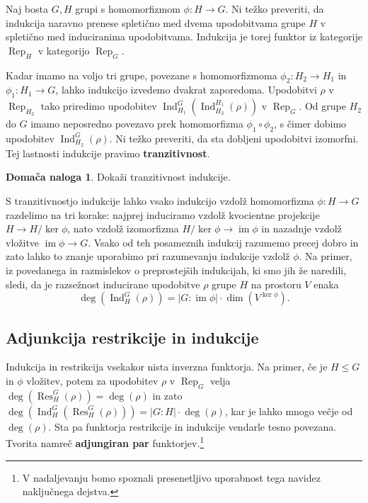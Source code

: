 \documentclass[11pt]{book}
\DeclareMathOperator\image{im}
\DeclareMathOperator\Res{Res}
\DeclareMathOperator\Ind{Ind}
\DeclareMathOperator\Rep{Rep}
\def\definicija{\color{rdeca}\bf}
\theoremstyle{definition}
\theoremstyle{zgled}
\theoremstyle{zgledbrezstevilke}
\theoremstyle{odprtproblem}
\theoremstyle{domacanaloga}
\newtheorem{domacanaloga}[theorem]{Domača naloga}
\theoremstyle{izrek}
\begin{document}
Naj bosta $G,H$ grupi s homomorfizmom $\phi \colon H \to G$. Ni težko preveriti, da indukcija naravno prenese spletično med dvema upodobitvama grupe $H$ v spletično med induciranima upodobitvama. Indukcija je torej funktor iz kategorije $\Rep_H$ v kategorijo $\Rep_G$.

Kadar imamo na voljo tri grupe, povezane s homomorfizmoma $\phi_2 \colon H_2 \to H_1$ in $\phi_1 \colon H_1 \to G$, lahko indukcijo izvedemo dvakrat zaporedoma. Upodobitvi $\rho$ v $\Rep_{H_2}$ tako priredimo upodobitev $\Ind^{G}_{H_1}(\Ind^{H_1}_{H_2}(\rho))$ v $\Rep_{G}$. Od grupe $H_2$ do $G$ imamo neposredno povezavo prek homomorfizma $\phi_1 \circ \phi_2$, s čimer dobimo upodobitev $\Ind^G_{H_2}(\rho)$. Ni težko preveriti, da sta dobljeni upodobitvi izomorfni. Tej lastnosti indukcije pravimo {\definicija tranzitivnost}.

\begin{domacanaloga}
    Dokaži tranzitivnost indukcije.
\end{domacanaloga}

S tranzitivnostjo indukcije lahko vsako indukcijo vzdolž homomorfizma $\phi \colon H \to G$ razdelimo na tri korake: najprej induciramo vzdolž kvocientne projekcije $H \to H/\ker \phi$, nato vzdolž izomorfizma $H/\ker \phi \to \image \phi$ in nazadnje vzdolž vložitve $\image \phi \to G$. Vsako od teh posameznih indukcij razumemo precej dobro in zato lahko to znanje uporabimo pri razumevanju indukcije vzdolž $\phi$. Na primer, iz povedanega in razmislekov o preprostejših indukcijah, ki smo jih že naredili, sledi, da je razsežnost inducirane upodobitve $\rho$ grupe $H$ na prostoru $V$ enaka
\[
    \textstyle \deg(\Ind^G_H(\rho)) = 
    |G:\image \phi| \cdot \dim(V^{\ker \phi}).
\]

\subsection{Adjunkcija restrikcije in indukcije}

Indukcija in restrikcija vsekakor nista inverzna funktorja. Na primer, če je $H \leq G$ in $\phi$ vložitev, potem za upodobitev $\rho$ v $\Rep_G$ velja $\deg(\Res^G_H(\rho)) = \deg(\rho)$ in zato $\deg(\Ind^G_H(\Res^G_H(\rho))) = |G:H| \cdot \deg(\rho)$, kar je lahko mnogo večje od $\deg(\rho)$. Sta pa funktorja restrikcije in indukcije vendarle tesno povezana. Tvorita namreč {\definicija adjungiran par} funktorjev.\footnote{V nadaljevanju bomo spoznali presenetljivo uporabnost tega navidez naključnega dejstva.}
\end{document}
